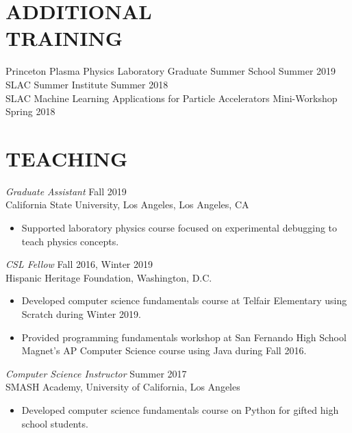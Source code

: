 \documentclass[margin,line]{res}
\begin{document}
\begin{resume}
\section{ADDITIONAL \\ TRAINING}
 
{ Princeton Plasma Physics Laboratory
Graduate Summer School }\hfill  Summer 2019\\
{SLAC Summer Institute }\hfill  Summer 2018 \\
 { 
SLAC Machine Learning Applications for Particle Accelerators Mini-Workshop} \hfill            Spring 2018 \\        

\printbibliography[title=POSTER, type=misc, heading=bibnumbered]     

\section{ TEACHING}  

{\sl Graduate Assistant} \hfill Fall 2019 \\
California State University, Los Angeles, Los Angeles, CA
\begin{itemize} \itemsep -2pt 
\item Supported laboratory physics course focused on experimental debugging to teach physics concepts.
\end{itemize}

{\sl CSL Fellow} \hfill        Fall 2016, Winter 2019  \\
Hispanic Heritage Foundation,   Washington, D.C.
\begin{itemize} \itemsep -2pt 
	\item Developed computer science fundamentals course at Telfair Elementary using Scratch during Winter 2019.
	\item Provided programming fundamentals workshop at San Fernando High School Magnet's AP Computer Science course using Java during Fall 2016.
\end{itemize}

 {\sl Computer Science Instructor} \hfill            Summer 2017 \\
SMASH Academy, University of California, Los Angeles
\begin{itemize}  \itemsep -2pt %
	\item Developed computer science fundamentals course on Python for gifted high school students.
\end{itemize} 


\end{resume}
\end{document}
